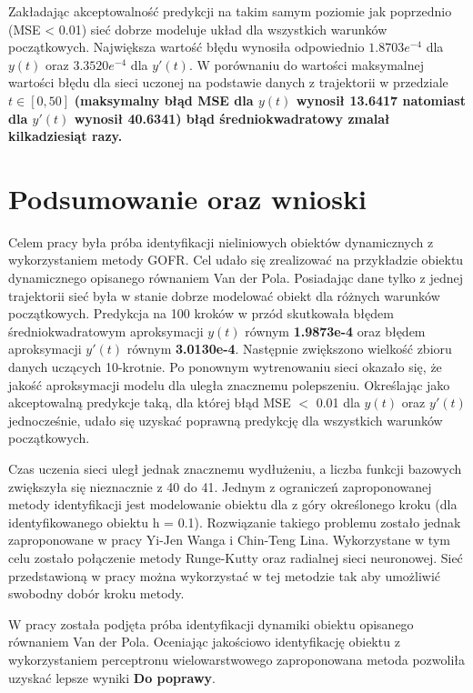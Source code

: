 Zakładając akceptowalność predykcji na takim samym poziomie jak poprzednio (MSE < 0.01) sieć dobrze modeluje układ dla wszystkich warunków początkowych. Największa wartość błędu wynosiła odpowiednio $1.8703e^{-4}$ dla $y(t)$ oraz  $3.3520e^{-4}$ dla $y'(t)$. W porównaniu do wartości maksymalnej wartości błędu dla sieci uczonej na podstawie danych z trajektorii w przedziale $t \in [0,50]$ \textbf{(maksymalny błąd MSE dla $y(t)$ wynosił 13.6417 natomiast dla $y'(t)$ wynosił 40.6341) błąd średniokwadratowy zmalał kilkadziesiąt razy.}

\clearpage
\section{Podsumowanie oraz wnioski}

Celem pracy była próba identyfikacji nieliniowych obiektów dynamicznych z wykorzystaniem metody GOFR. Cel udało się zrealizować na przykładzie obiektu dynamicznego opisanego równaniem Van der Pola. Posiadając dane tylko z jednej trajektorii sieć była w stanie dobrze modelować obiekt dla różnych warunków początkowych. Predykcja na 100 kroków w przód skutkowała błędem średniokwadratowym aproksymacji $y(t)$ równym \textbf{1.9873e-4} oraz błędem aproksymacji $y'(t)$ równym \textbf{3.0130e-4}. Następnie zwiększono wielkość zbioru danych uczących 10-krotnie. Po ponownym wytrenowaniu sieci okazało się, że jakość aproksymacji modelu dla uległa znacznemu polepszeniu.
Określając jako akceptowalną predykcje taką, dla której błąd MSE $<$ 0.01 dla $y(t)$ oraz $y'(t)$ jednocześnie, udało się uzyskać poprawną predykcję dla wszystkich warunków początkowych.

Czas uczenia sieci uległ jednak znacznemu wydłużeniu, a liczba funkcji bazowych zwiększyła się nieznacznie z 40 do 41. Jednym z ograniczeń zaproponowanej metody identyfikacji jest modelowanie obiektu dla z góry określonego kroku (dla identyfikowanego obiektu h = 0.1). Rozwiązanie takiego problemu zostało jednak zaproponowane w pracy Yi-Jen Wanga i Chin-Teng Lina\cite{Wang}. Wykorzystane w tym celu zostało połączenie metody Runge-Kutty oraz radialnej sieci neuronowej. Sieć przedstawioną w pracy można wykorzystać w tej metodzie tak aby umożliwić swobodny dobór kroku metody.

W pracy \cite{Masri} została podjęta próba identyfikacji dynamiki obiektu opisanego równaniem Van der Pola. Oceniając jakościowo identyfikację obiektu z wykorzystaniem perceptronu wielowarstwowego zaproponowana metoda pozwoliła uzyskać lepsze wyniki \textbf{Do poprawy}. 

